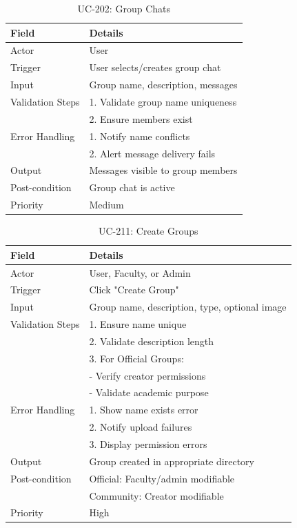 \begin{table}[H]
\centering
\caption{UC-202: Group Chats}
\begin{tabular}{|l|p{10cm}|}
\hline
\textbf{Field} & \textbf{Details} \\ \hline
Actor & User \\ \hline
Trigger & User selects/creates group chat \\ \hline
Input & Group name, description, messages \\ \hline
Validation Steps & 1. Validate group name uniqueness \\ 
                 & 2. Ensure members exist \\ \hline
Error Handling & 1. Notify name conflicts \\ 
               & 2. Alert message delivery fails \\ \hline
Output & Messages visible to group members \\ \hline
Post-condition & Group chat is active \\ \hline
Priority & Medium \\ \hline
\end{tabular}
\end{table}

\begin{table}[H]
\centering
\caption{UC-211: Create Groups}
\begin{tabular}{|l|p{10cm}|}
\hline
\textbf{Field} & \textbf{Details} \\ \hline
Actor & User, Faculty, or Admin \\ \hline
Trigger & Click "Create Group" \\ \hline
Input & Group name, description, type, optional image \\ \hline
Validation Steps & 1. Ensure name unique \\ 
                 & 2. Validate description length \\ 
                 & 3. For Official Groups: \\ 
                 & - Verify creator permissions \\ 
                 & - Validate academic purpose \\ \hline
Error Handling & 1. Show name exists error \\ 
               & 2. Notify upload failures \\ 
               & 3. Display permission errors \\ \hline
Output & Group created in appropriate directory \\ \hline
Post-condition & Official: Faculty/admin modifiable \\ 
               & Community: Creator modifiable \\ \hline
Priority & High \\ \hline
\end{tabular}
\end{table}

